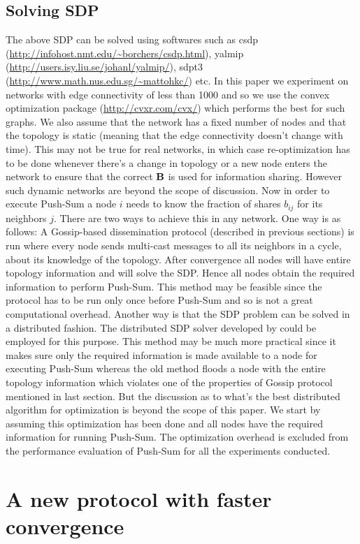 \documentclass[runningheads,a4paper]{llncs}
\begin{document}
\subsection{Solving SDP}
The above SDP can be solved using softwares such as csdp (\url{http://infohost.nmt.edu/~borchers/csdp.html}), yalmip (\url{http://users.isy.liu.se/johanl/yalmip/}), sdpt3 (\url{http://www.math.nus.edu.sg/~mattohkc/}) etc. In this paper we experiment on networks with edge connectivity of less than 1000 and so we use the convex optimization package (\url{http://cvxr.com/cvx/}) which performs the best for such graphs. We also assume that the network has a fixed number of nodes and that the topology is static (meaning that the edge connectivity doesn't change with time). This may not be true for real networks, in which case re-optimization has to be done whenever there's a change in topology or a new node enters the network to ensure that the correct $\bf{B}$ is used for information sharing. However such dynamic networks are beyond the scope of discussion. Now in order to execute Push-Sum a node $i$ needs to know the fraction of shares $b_{ij}$ for its neighbors $j$. There are two ways to achieve this in any network. One way is as follows: A Gossip-based dissemination protocol (described in previous sections) is run where every node sends multi-cast messages to all its neighbors in a cycle, about its knowledge of the topology. After convergence all nodes will have entire topology information and will solve the SDP. Hence all nodes obtain  the required information to perform Push-Sum. This method may be feasible since the protocol has to be run only once before Push-Sum and so is not a great computational overhead. Another way is that the SDP problem can be solved in a distributed fashion. The distributed SDP solver developed by \cite{biswas2006distributed} could be employed for this purpose. This method may be much more practical since it makes sure only the required information is made available to a node for executing Push-Sum whereas the old method floods a node with the entire topology information which violates one of the properties of Gossip protocol mentioned in last section. But the discussion as to what's the best distributed algorithm for optimization is beyond the scope of this paper. We start by assuming this optimization has been done and all nodes have the required information for running Push-Sum. The optimization overhead is excluded from the performance evaluation of Push-Sum for all the experiments conducted.

\section{A new protocol with faster convergence}
\end{document}
